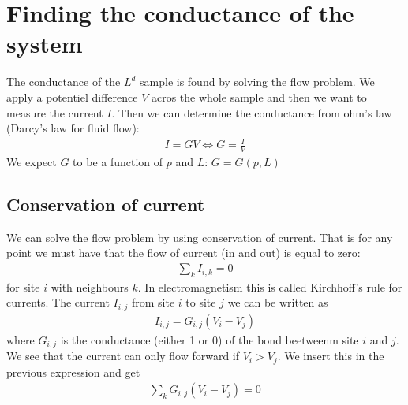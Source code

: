 \documentclass[reprint, amsmath, amssymb, aps]{revtex4-2}
\begin{document}
\section{Finding the conductance of the system }
The conductance of the $L^d$ sample is found by solving the flow problem. We apply a potentiel difference $V$ acros the whole sample and then we want to measure the current $I$. Then we can determine the conductance from ohm's law (Darcy's law for fluid flow):
\begin{align*}
  I = GV \Longleftrightarrow G = \frac{I}{V}
\end{align*}
We expect $G$ to be a function of $p$ and $L$: $G = G(p,L)$

\subsection{Conservation of current}
We can solve the flow problem by using conservation of current. That is for any point we must have that the flow of current (in and out) is equal to zero:
\begin{align*}
  \sum\limits_k I_{i,k} = 0
\end{align*}
for site $i$ with neighbours $k$. In electromagnetism this is called Kirchhoff's rule for currents. The current $I_{i,j}$ from site $i$ to site $j$ we can be written as
\begin{align*}
  I_{i,j} = G_{i,j}(V_i - V_j)
\end{align*}
where $G_{i,j}$ is the conductance (either 1 or 0) of the bond beetweenm site $i$ and $j$. We see that the current can only flow forward if $V_i > V_j$. We insert this in the previous expression and get
\begin{align}
  \sum\limits_k G_{i,j}(V_i - V_j) = 0
  \label{eq:kirch}
\end{align}
\end{document}
